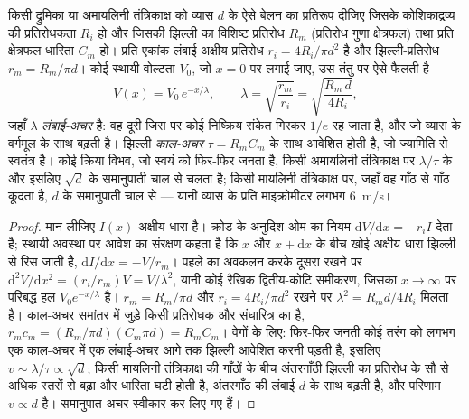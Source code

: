 \begin{theorem}\label{thm:b3:nervous-systems:cable}
किसी द्रुमिका या अमायलिनी तंत्रिकाक्ष को व्यास $d$ के ऐसे बेलन का
प्रतिरूप दीजिए जिसके कोशिकाद्रव्य की प्रतिरोधकता $R_{i}$ हो और जिसकी
झिल्ली का विशिष्ट प्रतिरोध $R_{m}$ (प्रतिरोध गुणा क्षेत्रफल) तथा प्रति
क्षेत्रफल धारिता $C_{m}$ हो। प्रति एकांक लंबाई अक्षीय प्रतिरोध
$r_{i} = 4R_{i}/\pi d^{2}$ है और झिल्ली-प्रतिरोध $r_{m} = R_{m}/\pi d$।
कोई स्थायी वोल्टता $V_{0}$, जो $x = 0$ पर लगाई जाए, उस तंतु पर ऐसे फैलती है
\[
V(x) = V_{0}\,e^{-x/\lambda}, \qquad
\lambda = \sqrt{\frac{r_{m}}{r_{i}}} = \sqrt{\frac{R_{m}\,d}{4R_{i}}},
\]
जहाँ $\lambda$ \emph{लंबाई-अचर} है: वह दूरी जिस पर कोई निष्क्रिय संकेत
गिरकर $1/e$ रह जाता है, और जो व्यास के वर्गमूल के साथ बढ़ती है। झिल्ली
\emph{काल-अचर} $\tau =
R_{m}C_{m}$ के साथ आवेशित होती है, जो ज्यामिति से स्वतंत्र है। कोई
क्रिया विभव, जो स्वयं को फिर-फिर जनता है, किसी अमायलिनी तंत्रिकाक्ष पर
$\lambda/\tau$ के और इसलिए $\sqrt{d}$ के समानुपाती चाल से चलता है; किसी
मायलिनी तंत्रिकाक्ष पर, जहाँ वह गाँठ से गाँठ कूदता है, $d$ के
समानुपाती चाल से --- यानी व्यास के प्रति माइक्रोमीटर लगभग
\qty{6}{m/s}।
\end{theorem}
\begin{proof}
मान लीजिए $I(x)$ अक्षीय धारा है। क्रोड के अनुदिश ओम का नियम
$\mathrm{d}V/\mathrm{d}x = -r_{i}I$ देता है; स्थायी अवस्था पर आवेश का
संरक्षण कहता है कि $x$ और $x + \mathrm{d}x$ के बीच खोई अक्षीय धारा
झिल्ली से रिस जाती है, $\mathrm{d}I/\mathrm{d}x = -V/r_{m}$। पहले का
अवकलन करके दूसरा रखने पर
$\mathrm{d}^{2}V/\mathrm{d}x^{2} = (r_{i}/r_{m})V = V/\lambda^{2}$, यानी
कोई रैखिक द्वितीय-कोटि समीकरण, जिसका $x \to \infty$ पर परिबद्ध हल
$V_{0}e^{-x/\lambda}$ है। $r_{m} = R_{m}/\pi d$ और $r_{i} =
4R_{i}/\pi d^{2}$ रखने पर $\lambda^{2} = R_{m}d/4R_{i}$ मिलता है।
काल-अचर समांतर में जुड़े किसी प्रतिरोधक और संधारित्र का है, $r_{m}c_{m} =
(R_{m}/\pi d)(C_{m}\pi d) = R_{m}C_{m}$। वेगों के लिए: फिर-फिर जनती कोई
तरंग को लगभग एक काल-अचर में एक लंबाई-अचर आगे तक झिल्ली आवेशित करनी
पड़ती है, इसलिए $v \sim \lambda/\tau \propto \sqrt{d}$; किसी मायलिनी
तंत्रिकाक्ष की गाँठों के बीच अंतरगाँठी झिल्ली का प्रतिरोध  के सौ
से अधिक स्तरों से बढ़ा और धारिता घटी होती है, अंतरगाँठ की लंबाई $d$ के
साथ बढ़ती है, और परिणाम $v \propto d$ है। समानुपात-अचर स्वीकार कर लिए
गए हैं।
\end{proof}


